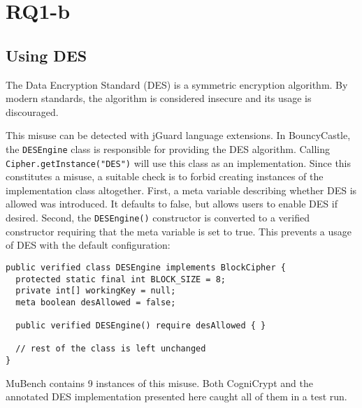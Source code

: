 \documentclass{article}
\begin{document}


\section{RQ1-b}

\subsection{Using DES}

The Data Encryption Standard (DES) is a symmetric encryption algorithm.
By modern standards, the algorithm is considered insecure and its usage is discouraged.

This misuse can be detected with jGuard language extensions. In BouncyCastle, the \texttt{DESEngine} class
is responsible for providing the DES algorithm.
Calling \texttt{Cipher.\allowbreak getInstance("DES")} will use this class as an implementation.
Since this constitutes a misuse, a suitable check is to forbid creating instances of the implementation class
altogether.
First, a meta variable describing whether DES is allowed was introduced. It defaults to false, but allows users to enable DES if desired.
Second, the \texttt{DESEngine()} constructor is converted to a verified constructor requiring that the
meta variable is set to true. This prevents a usage of DES with the default configuration:

\begin{lstlisting}[style=jGuard]
public verified class DESEngine implements BlockCipher {
  protected static final int BLOCK_SIZE = 8; 
  private int[] workingKey = null; 
  meta boolean desAllowed = false; 

  public verified DESEngine() require desAllowed { }

  // rest of the class is left unchanged
}
\end{lstlisting}

MuBench contains \num{9} instances of this misuse.
Both CogniCrypt and the annotated DES implementation presented here caught all of them
in a test run.
\end{document}
